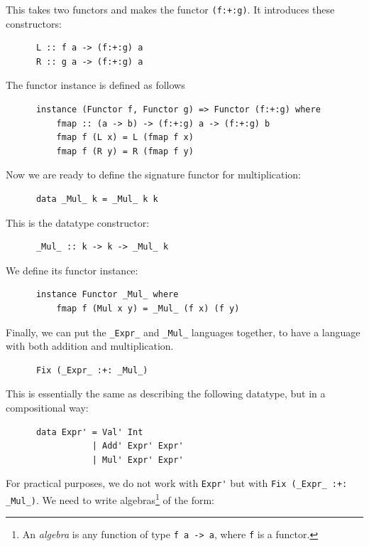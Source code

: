 \documentclass[a4paper,12pt]{article}
\theoremstyle{remark}
\begin{document}
  This takes two functors and makes the functor \lstinline{(f:+:g)}. It introduces these
  constructors:

  \begin{lstlisting}
      L :: f a -> (f:+:g) a
      R :: g a -> (f:+:g) a  \end{lstlisting}

  The functor instance is defined as follows

  \begin{lstlisting}
      instance (Functor f, Functor g) => Functor (f:+:g) where
          fmap :: (a -> b) -> (f:+:g) a -> (f:+:g) b
          fmap f (L x) = L (fmap f x)
          fmap f (R y) = R (fmap f y)  \end{lstlisting}

  Now we are ready to define the signature functor for multiplication:

  \begin{lstlisting}
      data _Mul_ k = _Mul_ k k  \end{lstlisting}

  This is the datatype constructor:

  \begin{lstlisting}
      _Mul_ :: k -> k -> _Mul_ k  \end{lstlisting}

  We define its functor instance:

  \begin{lstlisting}
      instance Functor _Mul_ where
          fmap f (Mul x y) = _Mul_ (f x) (f y)  \end{lstlisting}

  Finally, we can put the \lstinline{_Expr_} and \lstinline{_Mul_} languages together, to have a language with
  both addition and multiplication.

  \begin{lstlisting}
      Fix (_Expr_ :+: _Mul_)  \end{lstlisting}

  This is essentially the same as describing the following datatype, but in a
  compositional way:

  \begin{lstlisting}
      data Expr' = Val' Int
                 | Add' Expr' Expr'
                 | Mul' Expr' Expr'  \end{lstlisting}

  For practical purposes, we do not work with \lstinline{Expr'} but with \lstinline{Fix (_Expr_ :+: _Mul_)}.
  We need to write algebras\footnote{An \textit{algebra} is any function of type \lstinline{f a -> a},
  where \lstinline{f} is a functor.} of the form:
\end{document}
